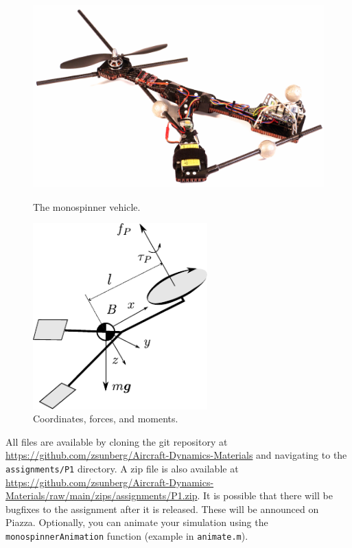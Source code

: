 \documentclass{article}
\theoremstyle{definition}
\begin{document}
\begin{figure}[h]
\centering
\begin{minipage}{0.9\textwidth}
\begin{minipage}{0.5\textwidth}
        \centering
        \includegraphics[width=\textwidth]{monospinner.pdf}
        \caption{The monospinner vehicle.}
\end{minipage}
\begin{minipage}{0.5\textwidth}
        \centering
        \includegraphics[width=0.6\textwidth]{monospinner-coordinates.pdf}
        \caption{Coordinates, forces, and moments.}
\end{minipage}
\end{minipage}
\end{figure}

All files are available by cloning the git repository at \url{https://github.com/zsunberg/Aircraft-Dynamics-Materials} and navigating to the \texttt{assignments/P1} directory. A zip file is also available at \url{https://github.com/zsunberg/Aircraft-Dynamics-Materials/raw/main/zips/assignments/P1.zip}. It is possible that there will be bugfixes to the assignment after it is released. These will be announced on Piazza. Optionally, you can animate your simulation using the \texttt{monospinnerAnimation} function (example in \texttt{animate.m}).
\end{document}
